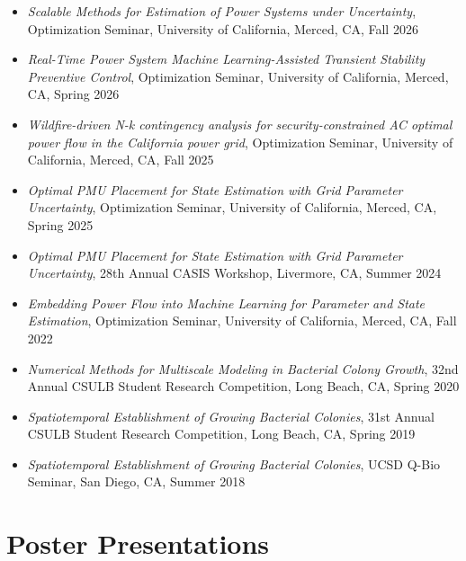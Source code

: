 \documentclass[11pt]{article}
\begin{document}
\begin{itemize}
\item {\it Scalable Methods for Estimation of Power Systems under
  Uncertainty}, Optimization Seminar, University of California, Merced,
  CA, Fall 2026
\item {\it Real-Time Power System Machine Learning-Assisted Transient
  Stability Preventive Control}, Optimization Seminar, University of
  California, Merced, CA, Spring 2026
\item {\it Wildfire-driven N-k contingency analysis for
  security-constrained AC optimal power flow in the California power
  grid}, Optimization Seminar, University of California, Merced, CA,
  Fall 2025
\item {\it Optimal PMU Placement for State Estimation with Grid
  Parameter Uncertainty}, Optimization Seminar, University of
  California, Merced, CA, Spring 2025
\item {\it Optimal PMU Placement for State Estimation with Grid
  Parameter Uncertainty}, 28th Annual CASIS Workshop, Livermore, CA,
  Summer 2024
\item {\it Embedding Power Flow into Machine Learning for Parameter and
  State Estimation}, Optimization Seminar, University of California,
  Merced, CA, Fall 2022
\item {\it Numerical Methods for Multiscale Modeling in Bacterial Colony
  Growth}, 32nd Annual CSULB Student Research Competition, Long Beach,
  CA, Spring 2020
\item {\it Spatiotemporal Establishment of Growing Bacterial Colonies},
  31st Annual CSULB Student Research Competition, Long Beach, CA, Spring
  2019
\item {\it Spatiotemporal Establishment of Growing Bacterial Colonies},
  UCSD Q-Bio Seminar, San Diego, CA, Summer 2018
\end{itemize}

\section*{Poster Presentations}
\end{document}

